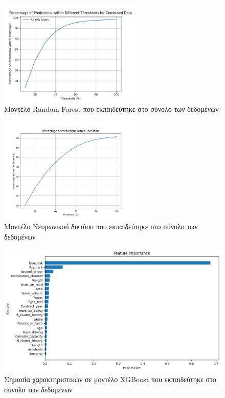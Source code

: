 \documentclass{llncs}
\begin{document}
\begin{figure}
    \begin{center}
        \includegraphics[width=0.6\textwidth]{images/combined_trained_all_thresholds_random_forest.png}
    \end{center}
    \caption{Μοντέλο Random Forest που εκπαιδεύτηκε στο σύνολο των δεδομένων}  
    \label{fig:random_forest_result}  
\end{figure}

\begin{figure}
    \begin{center}
        \includegraphics[width=0.6\textwidth]{images/neural_network_all_thresholds.png}
    \end{center}
    \caption{Μοντέλο Νευρωνικού δικτύου που εκπαιδεύτηκε στο σύνολο των δεδομένων}  
    \label{fig:neural_result}  
\end{figure}

\begin{figure}
    \begin{center}
        \includegraphics[width=1\textwidth]{images/feature_importance_combined_xgb.png}
    \end{center}
    \caption{Σημασία χαρακτηριστικών σε μοντέλο XGBoost που εκπαιδεύτηκε στο σύνολο των δεδομένων}  
    \label{fig:XGBoost_all_feature_importance}  
\end{figure}
\end{document}
